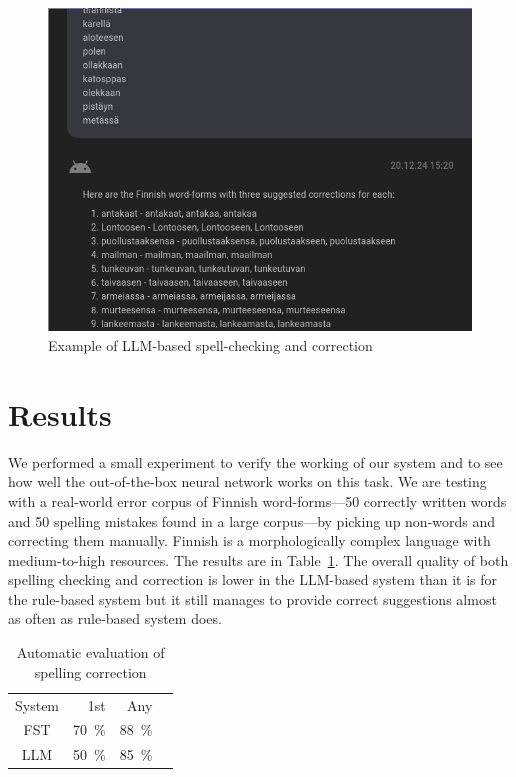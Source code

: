 \documentclass[free]{flammie}
\begin{document}
\begin{figure}
    \centering
    \includegraphics[width=.9\textwidth]{2024-12-20-152333_645x492_scrot.png}
    \caption{Example of LLM-based spell-checking and correction}\label{fig:overleaflink}
\end{figure}


\section{Results}

We performed a small experiment to verify the working of our system and to see
how well the out-of-the-box neural network works on this task.  We are testing
with a real-world error corpus of Finnish word-forms---50 correctly written
words and 50 spelling mistakes found in a large corpus---by picking up
non-words and correcting them manually.  Finnish is a morphologically complex
language with medium-to-high resources.  The results are in
Table~\ref{tab:my_lael}.  The overall quality of both spelling checking and
correction is lower in the LLM-based system than it is for the rule-based system
but it still manages to provide correct suggestions almost as often as
rule-based system does.

\begin{table}[htb]
    \centering
    \begin{tabular}{crrr}
       System  &  1st & Any \\
       FST & 70~\% & 88~\% \\
       LLM & 50~\% & 85~\% \\
    \end{tabular}
    \caption{Automatic evaluation of spelling correction }\label{tab:my_lael}
\end{table}
\end{document}
